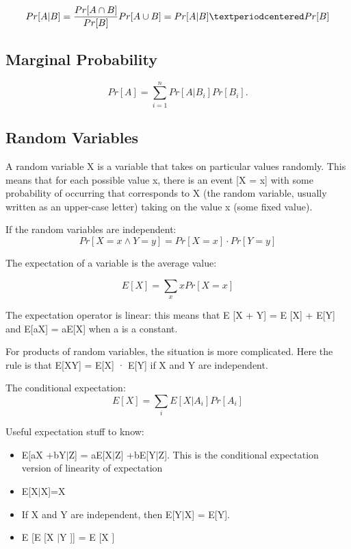 \documentclass[twoside]{article}
\begin{document}
\begin{equation}
    Pr[A|B]= \frac{Pr[A \cap B]}{Pr[B]}\\
    Pr [A  \cup B] = Pr [A | B] · Pr [B] 
\end{equation}

\subsection{Marginal Probability}
\begin{equation}
    Pr[A] = \sum_{i=1}^n  Pr[A | B_i]Pr[B_i].
\end{equation}

\subsection{Random Variables}

A random variable X is a variable that takes on particular values randomly. This means that for each possible value x, there is an event [X = x] with some probability of occurring that corresponds to X (the random variable, usually written as an upper-case letter) taking on the value x (some fixed value).


If the random variables are independent:
\begin{equation}
    Pr[X=x \land Y =y]=Pr[X=x]·Pr[Y =y]
\end{equation}

The expectation of a variable is the average value:

\begin{equation}
    E[X] =  \sum_x xPr[X = x]
\end{equation}

The expectation operator is linear: this means that E [X + Y] = E [X] + E[Y] and E[aX] = aE[X] when a is a constant.

For products of random variables, the situation is more complicated. Here the rule
is that E[XY] = E[X] · E[Y] if X and Y are independent.

The conditional expectation:
\begin{equation}
    E[X] =  \sum_i E[X | A_i]Pr[A_i] 
\end{equation}


Useful expectation stuff to know:
\begin{itemize}
    \item E[aX +bY$|$Z] = aE[X$|$Z] +bE[Y$|$Z]. This is the conditional expectation version of linearity of expectation 
	\item E[X$|$X]=X
	\item If X and Y are independent, then E[Y$|$X] = E[Y].
	\item E [E [X $|$Y ]] = E [X ]	
\end{itemize}
\end{document}
